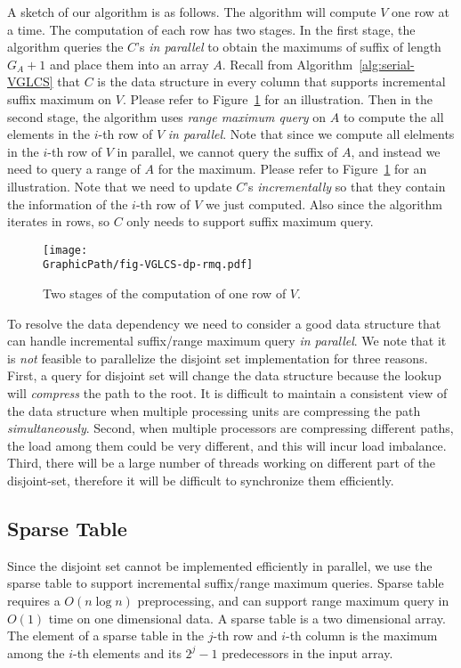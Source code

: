 A sketch of our algorithm is as follows.  The algorithm will compute
$V$ one row at a time.  The computation of each row has two stages.
In the first stage, the algorithm queries the $C$'s {\em in parallel}
to obtain the maximums of suffix of length $G_A + 1$ and place them
into an array $A$.  Recall from Algorithm~\ref{alg:serial-VGLCS} that
$C$ is the data structure in every column that supports incremental
suffix maximum on $V$.  Please refer to
Figure~\ref{fig:fig-VGLCS-dp-rmq} for an illustration.  Then in the
second stage, the algorithm uses {\em range maximum query} on $A$ to
compute the all elements in the $i$-th row of $V$ {\em in parallel}.
Note that since we compute all elelments in the $i$-th row of $V$ in
parallel, we cannot query the suffix of $A$, and instead we need to
query a range of $A$ for the maximum.  Please refer to
Figure~\ref{fig:fig-VGLCS-dp-rmq} for an illustration.  Note that we
need to update $C$'s {\em incrementally} so that they contain the
information of the $i$-th row of $V$ we just computed.  Also since the
algorithm iterates in rows, so $C$ only needs to support suffix
maximum query.

\begin{figure}
  \texttt{[image: \\GraphicPath/fig-VGLCS-dp-rmq.pdf]}
  \caption{Two stages of the computation of one row of $V$.}
  \label{fig:fig-VGLCS-dp-rmq}
\end{figure}

To resolve the data dependency we need to consider a good data
structure that can handle incremental suffix/range maximum query {\em
  in parallel}.  We note that it is {\em not} feasible to parallelize
the disjoint set implementation for three reasons.  First, a query for
disjoint set will change the data structure because the lookup will
{\em compress} the path to the root.  It is difficult to maintain a
consistent view of the data structure when multiple processing units
are compressing the path {\em simultaneously}.  Second, when multiple
processors are compressing different paths, the load among them could
be very different, and this will incur load imbalance. Third, there
will be a large number of threads working on different part of the
disjoint-set, therefore it will be difficult to synchronize them
efficiently.

\subsection{Sparse Table}

Since the disjoint set cannot be implemented efficiently in parallel,
we use the sparse table to support incremental suffix/range maximum
queries.  Sparse table~\cite{Berkman1993RecursiveSP} requires a $O(n
\log n)$ preprocessing, and can support range maximum query in $O(1)$
time on one dimensional data.  A sparse table is a two dimensional
array.  The element of a sparse table in the $j$-th row and $i$-th
column is the maximum among the $i$-th elements and its $2^j - 1$
predecessors in the input array.

